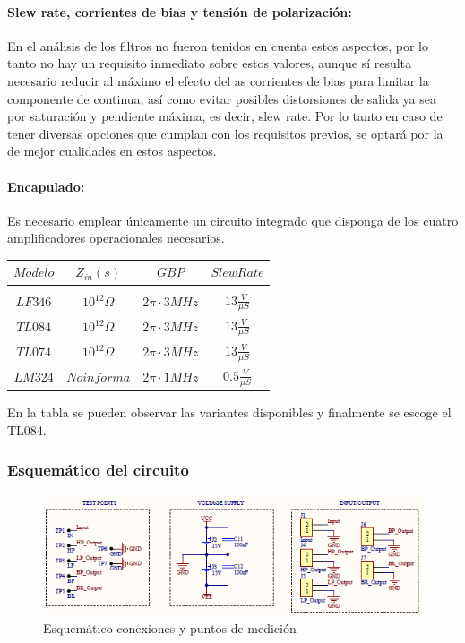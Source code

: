 \paragraph*{Slew rate, corrientes de bias y tensión de polarización:} En el an\'alisis de los filtros no fueron tenidos en cuenta estos aspectos, por lo tanto no hay un requisito inmediato sobre estos valores, aunque s\'i resulta necesario
reducir al m\'aximo el efecto del as corrientes de bias para limitar la componente de continua, as\'i como evitar posibles distorsiones de salida ya sea por saturaci\'on y pendiente m\'axima, es decir, slew rate. Por lo tanto en caso de tener diversas opciones
que cumplan con los requisitos previos, se optar\'a por la de mejor cualidades en estos aspectos.

\paragraph*{Encapulado:} Es necesario emplear \'unicamente un circuito integrado que disponga de los cuatro amplificadores operacionales necesarios.

\begin{table}[H]
    \centering
    \begin{tabular}{c c c c}
        $Modelo$ & $Z_{in}(s)$ & $GBP$ & $Slew Rate$ \\
        \hline \\
        $LF346$ & $10^{12} \Omega$ & $2 \pi \cdot 3MHz$ & $13 \frac{V}{\mu S}$ \\
        $TL084$ & $10^{12} \Omega$ & $2 \pi \cdot 3MHz$ & $13 \frac{V}{\mu S}$ \\
        $TL074$ & $10^{12} \Omega$ & $2 \pi \cdot 3MHz$ & $13 \frac{V}{\mu S}$ \\
        $LM324$ & $No informa$ & $2 \pi \cdot 1MHz$ & $0.5 \frac{V}{\mu S}$ \\
        \hline 
    \end{tabular}
\end{table}

En la tabla se pueden observar las variantes disponibles y finalmente se escoge el TL084.

\subsubsection{Esquem\'atico del circuito}

\begin{figure}[H]
    \centering
    \includegraphics[scale=1]{../EJ2/Recursos/esquematico_complementario.PNG}
    \caption{Esquem\'atico conexiones y puntos de medici\'on}
    \label{fig:esquematico_complementario}
\end{figure}

